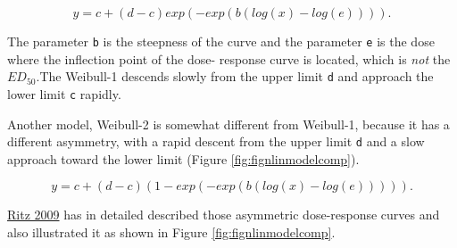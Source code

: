 \documentclass[letterpaper,]{book}
\begin{document}
\[y = c+(d-c)exp(-exp(b(log(x)-log(e)))) .\]

The parameter \texttt{b} is the steepness of the curve and the
parameter \texttt{e} is the dose where the inflection point of the dose-
response curve is located, which is \emph{not} the \(ED_{50}\).The Weibull-1 descends slowly from the upper limit \texttt{d} and approach the lower limit \texttt{c} rapidly.

Another model, Weibull-2 is somewhat different from Weibull-1, because it has a different asymmetry, with a rapid descent from the upper limit \texttt{d} and a slow approach toward the lower limit (Figure \ref{fig:fignlinmodelcomp}).

\[y = c+(d-c)(1-exp(-exp(b(log(x)-log(e))))) .\]

\href{http://onlinelibrary.wiley.com/doi/10.1002/etc.7/abstract}{Ritz 2009} has in detailed described those asymmetric dose-response curves and also illustrated it as shown in Figure \ref{fig:fignlinmodelcomp}.
\end{document}
